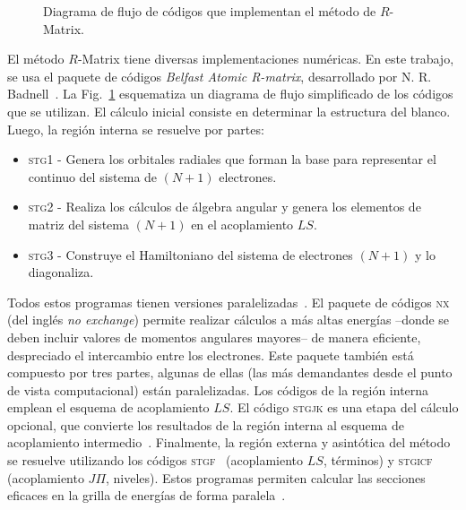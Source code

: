 \begin{figure}
\vspace{0.5cm}
\caption{Diagrama de flujo de códigos que implementan el método de
$R$-Matrix.}
\label{fig:rmatrixcodes}
\end{figure}

El método $R$-Matrix tiene diversas implementaciones numéricas. En este 
trabajo, se usa el paquete de códigos \textit{Belfast Atomic R-matrix}, 
desarrollado por N. R. Badnell~\cite{QUB-Badnell}. 
La Fig.~\ref{fig:rmatrixcodes} esquematiza un diagrama de flujo 
simplificado de los códigos que se utilizan. El cálculo inicial consiste 
en determinar la estructura del blanco. Luego, la región interna se 
resuelve por partes: 
\begin{itemize}
\item \textsc{stg1} - Genera los orbitales radiales que forman la base
para representar el continuo del sistema de $(N+1)$ electrones.
\item \textsc{stg2} - Realiza los cálculos de álgebra angular y genera 
los elementos de matriz del sistema $(N+1)$ en el acoplamiento $LS$.
\item \textsc{stg3} - Construye el Hamiltoniano del sistema de 
electrones $(N+1)$ y lo diagonaliza.
\end{itemize}
Todos estos programas tienen versiones paralelizadas~\cite{Mitnik:99,
Mitnik:01,Ballance:04}. El paquete de códigos 
\textsc{nx}~\cite{Burke:92} (del inglés \textit{no exchange}) permite 
realizar cálculos a más altas energías --donde se deben incluir valores 
de momentos angulares mayores-- de manera eficiente, despreciado el 
intercambio entre los electrones. Este paquete también 
está compuesto por tres partes, algunas de ellas (las más demandantes 
desde el punto de vista computacional) están paralelizadas. Los códigos 
de la región interna emplean el esquema de acoplamiento $LS$. El código 
\textsc{stgjk} es una etapa del cálculo opcional, que convierte los 
resultados de la región interna al esquema de acoplamiento 
intermedio~\cite{Griffin:98}. Finalmente, la región externa y asintótica 
del método se resuelve utilizando los códigos 
\textsc{stgf}~\cite{Seaton:85} (acoplamiento $LS$, términos) y 
\textsc{stgicf} (acoplamiento $J\Pi$, niveles). Estos programas permiten 
calcular las secciones eficaces en la grilla de energías de forma 
paralela~\cite{Mitnik:99,FernandezMenchero:20}. 


